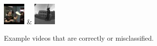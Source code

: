\begin{figure}[t]
\begin{tabu}
        \includegraphics[width=0.1\textwidth]{images/rep/R_57.png} &
        \includegraphics[width=0.1\textwidth]{images/rep/R_79.png}\\ \hline            
    \end{tabu}
    \caption{Example videos that are correctly or misclassified.}
    \label{fig:classexamples}
\end{figure}

